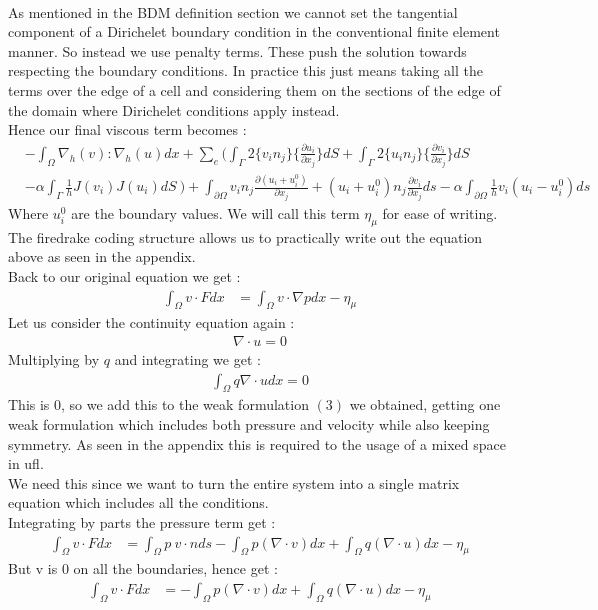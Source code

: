 \documentclass[11pt,twoside,a4paper]{article}
\begin{document}
\\
As mentioned in the BDM definition section we cannot set the tangential component of a Dirichelet boundary condition in the conventional finite element manner.  So instead we use penalty terms. These push the solution towards respecting the boundary conditions. In practice this just means taking all the terms over the edge of a cell and considering them on the sections of the edge of the domain where Dirichelet conditions apply instead.\\
 Hence our final viscous term becomes :\\
\begin{align*}
&-  \int_\Omega \nabla_h(v) : \nabla_h(u) dx + \sum_e ( \int_\Gamma 2 \{ v_i n_j \} \{ \frac{\partial u_i}{\partial x_j}\} dS + \int_\Gamma 2 \{ u_i n_j \} \{ \frac{\partial v_i}{\partial x_j}\} dS \\
&- \alpha \int_\Gamma \frac{1}{h}  J(v_i) J(u_i) dS \ ) + \int_{\partial  \Omega} v_i n_j \frac{\partial(u_i + u^0_i)}{\partial x_j} + (u_i + u^0_i) n_j\frac{\partial v_i}{\partial x_j} ds - \alpha \int_{\partial \Omega} \frac{1}{h} v_i(u_i-u^0_i)ds
\end{align*}
Where $u^0_i$ are the boundary values.
We will call this term $\eta_\mu$ for ease of writing. The firedrake coding structure allows us to practically write out the equation above as seen in the appendix.\\
Back to our original equation we get :
\begin{align}
\int_\Omega v \cdot F dx &= \int_\Omega v \cdot \nabla p dx - \eta_\mu
\end{align}
Let us consider the continuity equation again :
\begin{align*}
\nabla \cdot u = 0
\end{align*}
Multiplying by $q$ and integrating we get :
\begin{align*}
\int_\Omega q \nabla \cdot u dx = 0
\end{align*}
This is $0$, so we add this to the weak formulation $(3)$ we obtained, getting one weak formulation which includes both pressure and velocity while also keeping symmetry. As seen in the appendix this is required to the usage of a mixed space in ufl.\\
We need this since we want to turn the entire system into a single matrix equation which includes all the conditions.\\
Integrating by parts the pressure term get :
\begin{align}
\int_\Omega v \cdot F dx &= \int_\Omega p \ v \cdot n ds - \int_\Omega  p ( \nabla \cdot v) dx + \int_\Omega q (\nabla \cdot u) dx  - \eta_\mu
\end{align}
But v is $0$ on all the boundaries, hence get :
\begin{align}
\int_\Omega v \cdot F dx &= - \int_\Omega  p ( \nabla \cdot v) dx + \int_\Omega q (\nabla \cdot u) dx  - \eta_\mu
\end{align}
\end{document}
